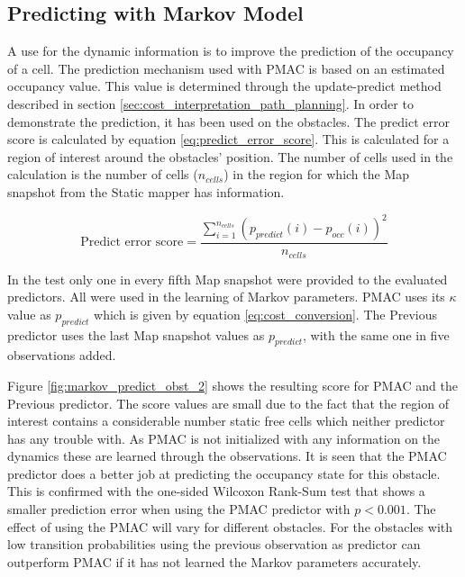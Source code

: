 
\subsection{Predicting with Markov Model}

A use for the dynamic information is to improve the prediction of the occupancy of a cell. The prediction mechanism used with PMAC is based on an estimated occupancy value. This value is determined through the update-predict method described in section \vref{sec:cost_interpretation_path_planning}. 
In order to demonstrate the prediction, it has been used on the obstacles. The predict error score is calculated by equation \ref{eq:predict_error_score}. This is calculated for a region of interest around the obstacles' position. The number of cells used in the calculation is the number of cells ($n_{cells}$) in the region for which the Map snapshot from the Static mapper has information. 

\begin{equation}
	\text{Predict error score} = \frac{\sum\limits_{i=1}^{n_{cells}} (p_{predict}(i)-p_{occ}(i))^2}{n_{cells}}
	\label{eq:predict_error_score}
\end{equation} 

In the test only one in every fifth Map snapshot were provided to the evaluated predictors.
All were used in the learning of Markov parameters.
PMAC uses its $\kappa$ value as $p_{predict}$ which is given by equation \vref{eq:cost_conversion}. 
The Previous predictor uses the last Map snapshot values as $p_{predict}$, with the same one in five observations added.

Figure \ref{fig:markov_predict_obst_2} shows the resulting score for PMAC and the Previous predictor. 
The score values are small due to the fact that the region of interest contains a considerable number static free cells which neither predictor has any trouble with. 
As PMAC is not initialized with any information on the dynamics these are learned through the observations. 
It is seen that the PMAC predictor does a better job at predicting the occupancy state for this obstacle. 
This is confirmed with the one-sided Wilcoxon Rank-Sum test that shows a smaller prediction error when using the PMAC predictor with $p<0.001$.
The effect of using the PMAC will vary for different obstacles. For the obstacles with low transition probabilities using the previous observation as predictor can outperform PMAC if it has not learned the Markov parameters accurately. 

